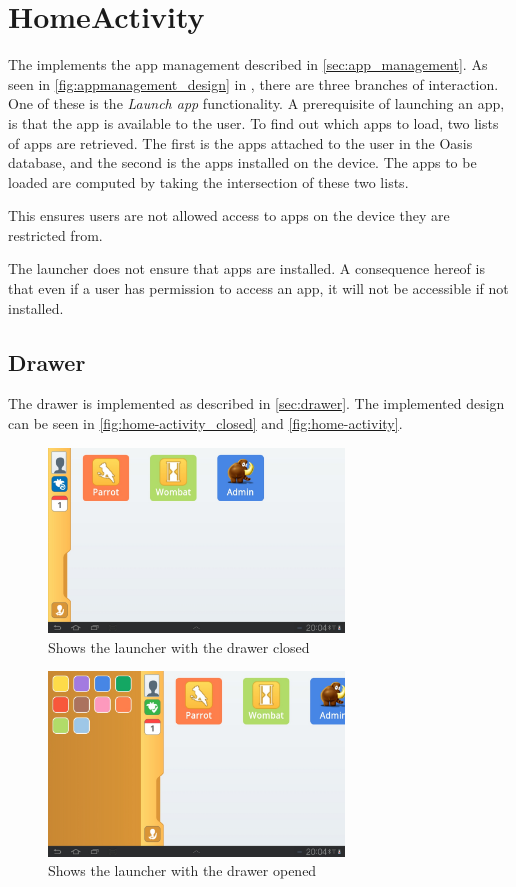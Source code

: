 \section{HomeActivity}
The  implements the app management described in \autoref{sec:app_management}. 
As seen in \autoref{fig:appmanagement_design} in , there are three branches of interaction. 
One of these is the \emph{Launch app} functionality.
A prerequisite of launching an app, is that the app is available to the user. 
To find out which apps to load, two lists of apps are retrieved. 
The first is the apps attached to the user in the Oasis database, and the second is the apps installed on the device.
The apps to be loaded are computed by taking the intersection of these two lists.

This ensures users are not allowed access to apps on the device they are restricted from.

The launcher does not ensure that apps are installed. 
A consequence hereof is that even if a user has permission to access an app, it will not be accessible if not installed.

\subsection{Drawer}
The drawer is implemented as described in \autoref{sec:drawer}.
The implemented design can be seen in \autoref{fig:home-activity_closed} and \autoref{fig:home-activity}.

\begin{figure}[h!]
	\centering
	\includegraphics[width=0.7\textwidth]{gfx/implementation-home-drawerclosed}
	\caption{Shows the launcher with the drawer closed}
	\label{fig:home-activity_closed}
\end{figure}

\begin{figure}[h!]
	\centering
	\includegraphics[width=0.7\textwidth]{gfx/implementation-home-draweropen}
	\caption{Shows the launcher with the drawer opened}
	\label{fig:home-activity}
\end{figure}

